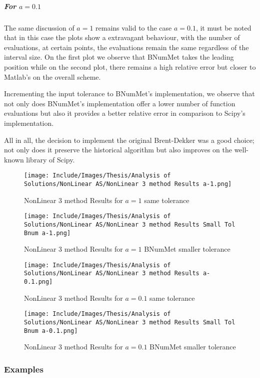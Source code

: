 \subparagraph{For $a=0.1$}
The same discussion of $a=1$ remains valid to the case $a=0.1$, it must be noted that in this case the plots show a extravagant behaviour, with the number of evaluations, at certain points, the evaluations remain the same regardless of the interval size. On the first plot  we observe that BNumMet takes the leading position while on the second plot, there remains a high relative error but closer to Matlab's on the overall scheme.

Incrementing the input tolerance to BNumMet's implementation, we observe  that not only does BNumMet's implementation offer a lower number of function evaluations but also it provides a better relative error in comparison to Scipy's implementation.

All in all, the decision to implement the original Brent-Dekker was a good choice; not only does it preserve the historical algorithm but also improves on the well-known library of Scipy.

\begin{sidewaysfigure}[H]
    \centering
    \texttt{[image: Include/Images/Thesis/Analysis of Solutions/NonLinear AS/NonLinear 3 method Results a-1.png]}
    \caption{NonLinear 3 method Results for $a=1$ same tolerance}
    \label{fig:NonLinear 3 method Results for a=1 same tolerance}
\end{sidewaysfigure}

\begin{sidewaysfigure}[H]
    \centering
    \texttt{[image: Include/Images/Thesis/Analysis of Solutions/NonLinear AS/NonLinear 3 method Results Small Tol Bnum a-1.png]}
    \caption{NonLinear 3 method Results for $a=1$ BNumMet smaller tolerance}
    \label{fig:NonLinear 3 method Results for a=1 BNumMet smaller tolerance}
\end{sidewaysfigure}

\begin{sidewaysfigure}[H]
    \centering
    \texttt{[image: Include/Images/Thesis/Analysis of Solutions/NonLinear AS/NonLinear 3 method Results a-0.1.png]}
    \caption{NonLinear 3 method Results for $a=0.1$ same tolerance}
\label{fig:NonLinear 3 method Results for a=0.1 same tolerance}
\end{sidewaysfigure}

\begin{sidewaysfigure}[H]
    \centering
    \texttt{[image: Include/Images/Thesis/Analysis of Solutions/NonLinear AS/NonLinear 3 method Results Small Tol Bnum a-0.1.png]}
    \caption{NonLinear 3 method Results for $a=0.1$ BNumMet smaller tolerance}
\label{fig:NonLinear 3 method Results for a=0.1 BNumMet smaller tolerance}
\end{sidewaysfigure}


\subsubsection{Examples}
	
